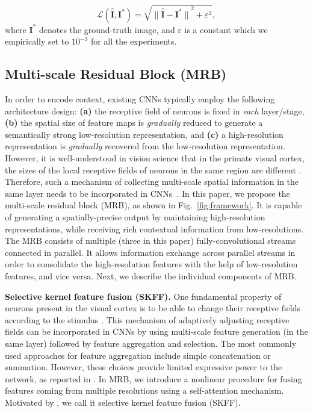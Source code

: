 \documentclass[runningheads]{llncs}
\begin{document}
\begin{equation}
\label{Eq:loss}
\mathcal{L}(\mathbf{\hat{I}},\mathbf{I}^*) = \sqrt{ {\|\mathbf{\hat{I}}-\mathbf{I}^*\|}^2 + {\varepsilon}^2 },
\end{equation}
where $\mathbf{I}^*$ denotes the ground-truth image, and $\varepsilon$ is a constant which we empirically set to $10^{-3}$ for all the experiments.



\subsection{Multi-scale Residual Block (MRB)}
\label{sec:msrb}
In order to encode context, existing CNNs \cite{ronneberger2015u,newell2016stacked,noh2015learning,xiao2018simple,badrinarayanan2017segnet,peng2016recurrent} typically employ the following architecture design: \textbf{(a)} the receptive field of neurons is fixed in \textit{each} layer/stage, \textbf{(b)} the spatial size of feature maps is \textit{gradually} reduced to generate a semantically strong low-resolution representation, and \textbf{(c)} a high-resolution representation is \textit{gradually} recovered from the low-resolution representation.  
However, it is well-understood in vision science that in the primate visual cortex, the sizes of the local receptive fields of neurons in the same region are different \cite{hubel1962receptive,riesenhuber1999hierarchical,serre2007robust,hung2005fast}. 
Therefore, such a mechanism of collecting multi-scale spatial information in the same layer needs to be incorporated in CNNs~\cite{huang2017multi,hrnet,fourure2017residual,Szegedy2015}.
In this paper, we propose the multi-scale residual block (MRB), as shown in Fig.~\ref{fig:framework}. 
It is capable of generating a spatially-precise output by maintaining high-resolution representations, while receiving rich contextual information from low-resolutions. 
The MRB consists of multiple (three in this paper) fully-convolutional streams connected in parallel. 
It allows information exchange across parallel streams in order to consolidate the high-resolution features with the help of low-resolution features, and vice versa. Next, we describe the individual components of MRB.




\vspace{0.4em} \noindent \textbf{Selective kernel feature fusion (SKFF).}
One fundamental property of neurons present in the visual cortex is to be able to change their receptive fields according to the stimulus \cite{li2019selective}. 
This mechanism of adaptively adjusting receptive fields can be incorporated in CNNs by using multi-scale feature generation (in the same layer) followed by feature aggregation and selection. 
The most commonly used approaches for feature aggregation include simple concatenation or summation. However, these choices provide limited expressive power to the network, as reported in \cite{li2019selective}.
In MRB, we introduce a nonlinear procedure for fusing features coming from multiple resolutions using a self-attention mechanism. Motivated by \cite{li2019selective}, we call it selective kernel feature fusion (SKFF). 
\end{document}
